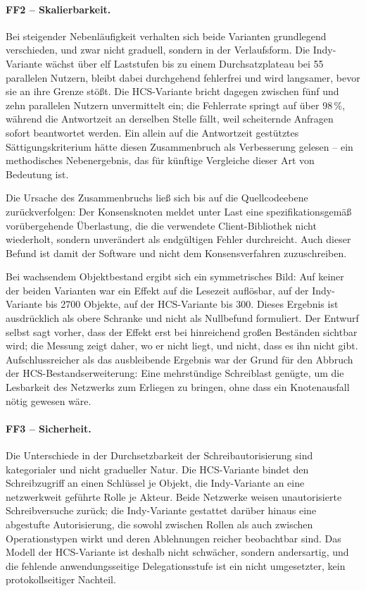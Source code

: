 \paragraph{FF2 -- Skalierbarkeit.} Bei steigender Nebenläufigkeit verhalten sich beide Varianten grundlegend verschieden, und zwar nicht graduell, sondern in der Verlaufsform. Die Indy-Variante wächst über elf Laststufen bis zu einem Durchsatzplateau bei 55 parallelen Nutzern, bleibt dabei durchgehend fehlerfrei und wird langsamer, bevor sie an ihre Grenze stößt. Die HCS-Variante bricht dagegen zwischen fünf und zehn parallelen Nutzern unvermittelt ein; die Fehlerrate springt auf über 98\,\%, während die Antwortzeit an derselben Stelle fällt, weil scheiternde Anfragen sofort beantwortet werden. Ein allein auf die Antwortzeit gestütztes Sättigungskriterium hätte diesen Zusammenbruch als Verbesserung gelesen -- ein methodisches Nebenergebnis, das für künftige Vergleiche dieser Art von Bedeutung ist.

Die Ursache des Zusammenbruchs ließ sich bis auf die Quellcodeebene zurückverfolgen: Der Konsensknoten meldet unter Last eine spezifikationsgemäß vorübergehende Überlastung, die die verwendete Client-Bibliothek nicht wiederholt, sondern unverändert als endgültigen Fehler durchreicht. Auch dieser Befund ist damit der Software und nicht dem Konsensverfahren zuzuschreiben.

Bei wachsendem Objektbestand ergibt sich ein symmetrisches Bild: Auf keiner der beiden Varianten war ein Effekt auf die Lesezeit auflösbar, auf der Indy-Variante bis 2700 Objekte, auf der HCS-Variante bis 300. Dieses Ergebnis ist ausdrücklich als obere Schranke und nicht als Nullbefund formuliert. Der Entwurf selbst sagt vorher, dass der Effekt erst bei hinreichend großen Beständen sichtbar wird; die Messung zeigt daher, wo er nicht liegt, und nicht, dass es ihn nicht gibt. Aufschlussreicher als das ausbleibende Ergebnis war der Grund für den Abbruch der HCS-Bestandserweiterung: Eine mehrstündige Schreiblast genügte, um die Lesbarkeit des Netzwerks zum Erliegen zu bringen, ohne dass ein Knotenausfall nötig gewesen wäre.

\paragraph{FF3 -- Sicherheit.} Die Unterschiede in der Durchsetzbarkeit der Schreibautorisierung sind kategorialer und nicht gradueller Natur. Die HCS-Variante bindet den Schreibzugriff an einen Schlüssel je Objekt, die Indy-Variante an eine netzwerkweit geführte Rolle je Akteur. Beide Netzwerke weisen unautorisierte Schreibversuche zurück; die Indy-Variante gestattet darüber hinaus eine abgestufte Autorisierung, die sowohl zwischen Rollen als auch zwischen Operationstypen wirkt und deren Ablehnungen reicher beobachtbar sind. Das Modell der HCS-Variante ist deshalb nicht schwächer, sondern andersartig, und die fehlende anwendungsseitige Delegationsstufe ist ein nicht umgesetzter, kein protokollseitiger Nachteil.

